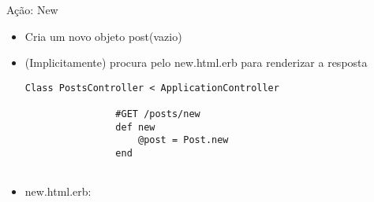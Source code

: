 \begin{frame}{Ação: New}
	\begin{itemize}
		\item Cria um novo objeto \alert{post}(vazio) 
		\item (Implicitamente) procura pelo \alert{new.html.erb} para renderizar a resposta
		\begin{lstlisting}[style=RubyInputStyle, caption=posts_controller.rb]
			Class PostsController < ApplicationController
				
				#GET /posts/new  
				def new
					@post = Post.new 
				end 
				
		\end{lstlisting}		
		
		\item \alert{new.html.erb}:
		
				
	\end{itemize}	
\end{frame}